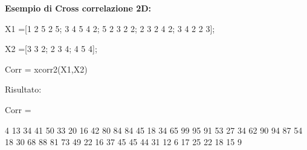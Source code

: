 \documentclass[a4paper, 10pt]{report}
\begin{document}
\noindent \textbf{Esempio di Cross correlazione 2D:}

\begin{code}
 
X1 =[1     2     5     2     5;
     3     4     5     4     2;
     5     2     3     2     2;
     2     3     2     4     2;
     3     4     2     2     3];
        
X2 =[3     3     2;
     2     3     4;
     4     5     4];
 
Corr = xcorr2(X1,X2)
 

\end{code}

\noindent Risultato:
\begin{code}
Corr =

     4    13    34    41    50    33    20
    16    42    80    84    84    45    18
    34    65    99    95    91    53    27
    34    62    90    94    87    54    18
    30    68    88    81    73    49    22
    16    37    45    45    44    31    12
     6    17    25    22    18    15     9
\end{code}
\end{document}
